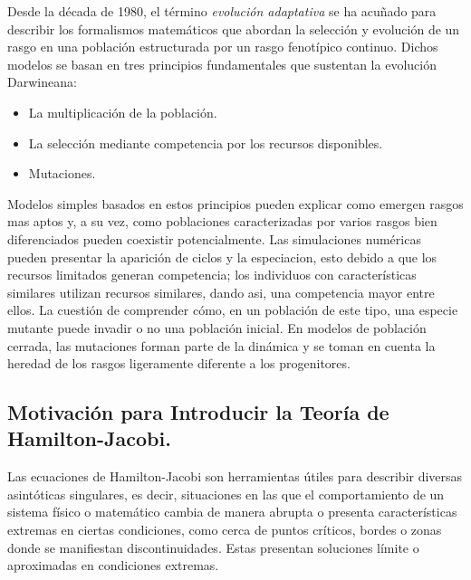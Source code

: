 \citep{Mirrahimi2011} Desde la década de 1980, el término \textit{evolución adaptativa} se ha acuñado para describir los formalismos matemáticos que abordan la selección y evolución de un rasgo en una población estructurada por un rasgo fenotípico continuo. Dichos modelos se basan en tres principios fundamentales que sustentan la evolución Darwineana:

\begin{itemize}
	\item {

	      {La multiplicación de la población.}

	      }

	\item {

	      {La selección mediante competencia por los recursos disponibles.}
	      }

	\item {

	      {Mutaciones.}

	      }
\end{itemize}

Modelos simples basados en estos principios pueden explicar como emergen rasgos mas aptos y, a su vez, como poblaciones caracterizadas por varios rasgos bien diferenciados pueden coexistir potencialmente. Las simulaciones numéricas pueden presentar la aparición de ciclos y la especiacion, esto debido a que los recursos limitados generan competencia; los individuos con características similares utilizan recursos similares, dando asi, una competencia mayor entre ellos. La cuestión de comprender cómo, en un población de este tipo, una especie mutante puede invadir o no una población inicial. En modelos de población cerrada, las mutaciones forman parte de la dinámica y se toman en cuenta la heredad de los rasgos ligeramente diferente a los progenitores.

\subsection{Motivación para Introducir la Teoría de Hamilton-Jacobi.}

\citep{barles2007} Las ecuaciones de Hamilton-Jacobi son herramientas útiles para describir diversas asintóticas singulares, es decir, situaciones en las que el comportamiento de un sistema físico o matemático cambia  de manera abrupta o presenta características extremas en ciertas condiciones, como cerca de puntos críticos, bordes o zonas donde se manifiestan discontinuidades. Estas presentan soluciones límite o aproximadas en condiciones extremas.



